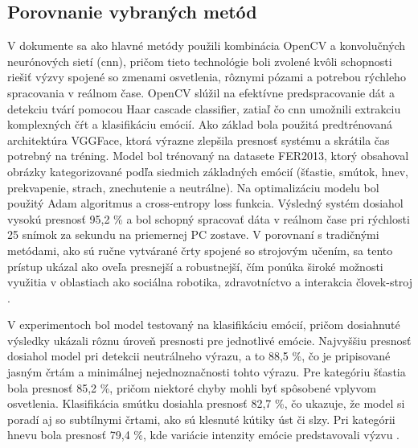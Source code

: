\subsection{Porovnanie vybraných metód}
V dokumente sa ako hlavné metódy použili kombinácia OpenCV a konvolučných neurónových sietí (\gls{cnn}), pričom tieto technológie boli zvolené kvôli schopnosti riešiť výzvy 
spojené so zmenami osvetlenia, rôznymi pózami a potrebou rýchleho spracovania v reálnom čase. OpenCV slúžil na efektívne predspracovanie dát a 
detekciu tvárí pomocou Haar cascade classifier, zatiaľ čo \gls{cnn} umožnili extrakciu komplexných čŕt a klasifikáciu emócií. Ako základ bola použitá predtrénovaná
architektúra VGGFace, ktorá výrazne zlepšila presnosť systému a skrátila čas potrebný na tréning. Model bol trénovaný na datasete FER2013, ktorý obsahoval obrázky
kategorizované podľa siedmich základných emócií (šťastie, smútok, hnev, prekvapenie, strach, znechutenie a neutrálne). Na optimalizáciu modelu bol použitý Adam 
algoritmus a cross-entropy loss funkcia. Výsledný systém dosiahol vysokú presnosť 95,2 \% a bol schopný spracovať dáta v reálnom čase pri rýchlosti 25 snímok
za sekundu na priemernej PC zostave. V porovnaní s tradičnými metódami, ako sú ručne vytvárané črty spojené so strojovým učením, sa tento prístup ukázal ako 
oveľa presnejší a robustnejší, čím ponúka široké možnosti využitia v oblastiach ako sociálna robotika, zdravotníctvo a interakcia človek-stroj \cite{inProceedings02}.

V experimentoch bol model testovaný na klasifikáciu emócií, pričom dosiahnuté výsledky ukázali rôznu úroveň presnosti pre jednotlivé emócie. 
Najvyššiu presnosť dosiahol model pri detekcii neutrálneho výrazu, a to 88,5 \%, čo je pripisované jasným črtám a minimálnej nejednoznačnosti tohto výrazu. 
Pre kategóriu šťastia bola presnosť 85,2 \%, pričom niektoré chyby mohli byť spôsobené vplyvom osvetlenia. Klasifikácia smútku dosiahla presnosť 82,7 \%, 
čo ukazuje, že model si poradí aj so subtílnymi črtami, ako sú klesnuté kútiky úst či slzy. Pri kategórii hnevu bola presnosť 79,4 \%, kde variácie intenzity emócie 
predstavovali výzvu \cite{inProceedings02}.

